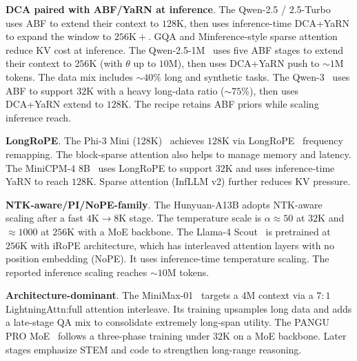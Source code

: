 \medskip

\noindent\textbf{DCA paired with ABF/YaRN at inference}.
The Qwen-2.5 / 2.5-Turbo~\cite{Yang2024Qwen25TR} uses ABF to extend their context to $128\mathrm{K}$, then uses inference-time DCA{+}YaRN to expand the window to $256\mathrm{K}+$. GQA and Minference-style sparse attention reduce KV cost at inference.
The Qwen-2.5-1M~\cite{yang2025qwen2} uses five ABF stages to extend their context to $256\mathrm{K}$ (with $\theta$ up to $10\mathrm{M}$), then uses DCA{+}YaRN push to $\sim\!1\mathrm{M}$ tokens. The data mix includes $\sim\!40\%$ long and synthetic tasks.
The Qwen-3~\cite{yang2025qwen3} uses ABF to support $32\mathrm{K}$ with a heavy long-data ratio ($\sim\!75\%$), then uses DCA{+}YaRN extend to $128\mathrm{K}$. The recipe retains ABF priors while scaling inference reach.

\medskip

\noindent\textbf{LongRoPE}.
The Phi-3 Mini (128K)~\cite{abdin2024phi3} achieves $128\mathrm{K}$ via LongRoPE~\cite{ding2024longrope} frequency remapping. The block-sparse attention also helps to manage memory and latency.
The MiniCPM-4 8B~\cite{team2025minicpm4} uses LongRoPE to support $32\mathrm{K}$ and uses inference-time YaRN to reach $128\mathrm{K}$. Sparse attention (InfLLM v2) further reduces KV pressure.

\medskip

\noindent\textbf{NTK-aware/PI/NoPE-family}.
The Hunyuan-A13B adopts NTK-aware scaling after a fast $4\mathrm{K}\!\to\!8\mathrm{K}$ stage. The temperature scale is $\alpha\!\approx\!50$ at $32\mathrm{K}$ and $\approx\!1000$ at $256\mathrm{K}$ with a MoE backbone.
The Llama-4 Scout~\cite{meta2025llama4} is pretrained at $256\mathrm{K}$ with iRoPE architecture, which has interleaved attention layers with no position embedding (NoPE). It uses inference-time temperature scaling. The reported inference scaling reaches $\sim\!10\mathrm{M}$ tokens.

\medskip

\noindent\textbf{Architecture-dominant}.
The MiniMax-01~\cite{li2025minimax} targets a $4\mathrm{M}$ context via a $7{:}1$ LightningAttn:full attention interleave. Its training upsamples long data and adds a late-stage QA mix to consolidate extremely long-span utility.
The PANGU PRO MoE~\cite{tang2025pangu} follows a three-phase training under $32\mathrm{K}$ on a MoE backbone. Later stages emphasize STEM and code to strengthen long-range reasoning.

\medskip

